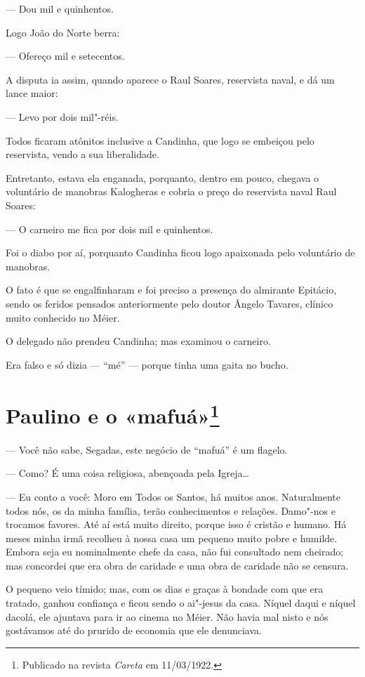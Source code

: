 --- Dou mil e quinhentos.

Logo João do Norte berra:

--- Ofereço mil e setecentos.

A disputa ia assim, quando aparece o Raul Soares, reservista naval, e dá
um lance maior:

--- Levo por dois mil"-réis.

Todos ficaram atônitos inclusive a Candinha, que logo se embeiçou pelo
reservista, vendo a sua liberalidade.

Entretanto, estava ela enganada, porquanto, dentro em pouco, chegava o
voluntário de manobras Kalogheras e cobria o preço do reservista naval
Raul Soares:

--- O carneiro me fica por dois mil e quinhentos.

Foi o diabo por aí, porquanto Candinha ficou logo apaixonada pelo
voluntário de manobras.

O fato é que se engalfinharam e foi preciso a presença do almirante
Epitácio, sendo os feridos pensados anteriormente pelo doutor Ângelo
Tavares, clínico muito conhecido no Méier.

O delegado não prendeu Candinha; mas examinou o carneiro.

Era falso e só dizia --- ``mé'' --- porque tinha uma gaita no bucho.


\chapter[Paulino e o «mafuá»]{Paulino e o «mafuá»\footnote[*]{Publicado na revista \emph{Careta} em 11/03/1922.}}

--- Você não sabe, Segadas, este negócio de ``mafuá'' é um flagelo.

--- Como? É uma coisa religiosa, abençoada pela Igreja\ldots{}

--- Eu conto a você: Moro em Todos os Santos, há muitos anos.
Naturalmente todos nós, os da minha família, terão conhecimentos e
relações. Damo"-nos e trocamos favores. Até aí está muito direito, porque
isso é cristão e humano. Há meses minha irmã recolheu à nossa casa um
pequeno muito pobre e humilde. Embora seja eu nominalmente chefe da
casa, não fui consultado nem cheirado; mas concordei que era obra de
caridade e uma obra de caridade não se censura.

O pequeno veio tímido; mas, com os dias e graças à bondade com que era
tratado, ganhou confiança e ficou sendo o ai"-jesus da casa. Níquel daqui
e níquel dacolá, ele ajuntava para ir ao cinema no Méier. Não havia mal
nisto e nós gostávamos até do prurido de economia que ele denunciava.

